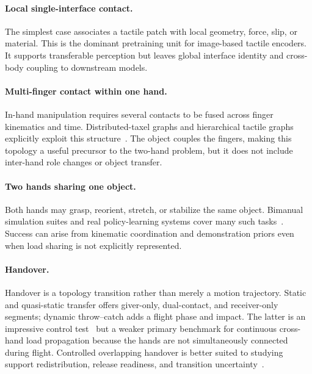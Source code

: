 \paragraph{Local single-interface contact.}
The simplest case associates a tactile patch with local geometry, force, slip,
or material. This is the dominant pretraining unit for image-based tactile
encoders. It supports transferable perception but leaves global interface
identity and cross-body coupling to downstream models.

\paragraph{Multi-finger contact within one hand.}
In-hand manipulation requires several contacts to be fused across finger
kinematics and time. Distributed-taxel graphs and hierarchical tactile graphs
explicitly exploit this structure~\cite{funabashi2022distributed,yang2023tacgnn}.
The object couples the fingers, making this topology a useful precursor to the
two-hand problem, but it does not include inter-hand role changes or object
transfer.

\paragraph{Two hands sharing one object.}
Both hands may grasp, reorient, stretch, or stabilize the same object. Bimanual
simulation suites and real policy-learning systems cover many such
tasks~\cite{chen2022bidexhands,shaw2024bidex,jiang2024dexmimicgen}.
Success can arise from kinematic coordination and demonstration priors even when
load sharing is not explicitly represented.

\paragraph{Handover.}
Handover is a topology transition rather than merely a motion trajectory. Static
and quasi-static transfer offers giver-only, dual-contact, and receiver-only
segments; dynamic throw--catch adds a flight phase and impact. The latter is an
impressive control test~\cite{huang2023dynamichandover} but a weaker primary
benchmark for continuous cross-hand load propagation because the hands are not
simultaneously connected during flight. Controlled overlapping handover is
better suited to studying support redistribution, release readiness, and
transition uncertainty~\cite{costanzo2021handover,wang2024contacthandover}.

